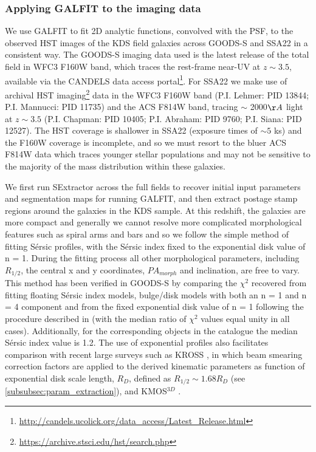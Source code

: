 \documentclass[fleqn,usenatbib]{mn2e}
\newcommand{\Sers}{S\'{e}rsic }
\begin{document}
\subsubsection{Applying GALFIT to the imaging data}\label{subsubsec:galfitting}
We use GALFIT \citep{Peng2010_galfit} to fit 2D analytic functions, convolved with the PSF, to the observed HST images of the KDS field galaxies across GOODS-S and SSA22 in a consistent way.
The GOODS-S imaging data used is the latest release of the total field in WFC3 F160W band, which traces the rest-frame near-UV at $z \sim 3.5$, available via the CANDELS \citep{Grogin2011,Koekemoer2011} data access portal\footnote{\tiny{\url{http://candels.ucolick.org/data_access/Latest_Release.html}}}.
For SSA22 we make use of archival HST imaging\footnote{\tiny{\url{https://archive.stsci.edu/hst/search.php}}} data in the WFC3 F160W band (P.I. Lehmer: PID 13844; P.I. Mannucci: PID 11735) and the ACS F814W band, tracing $\sim$ 2000$\AA$ light at $z\sim 3.5$ (P.I. Chapman: PID 10405; P.I. Abraham: PID 9760; P.I. Siana: PID 12527).
The HST coverage is shallower in SSA22 (exposure times of $\sim 5$ ks) and the F160W coverage is incomplete, and so we must resort to the bluer ACS F814W data which traces younger stellar populations and may not be sensitive to the majority of the mass distribution within these galaxies.

We first run SExtractor \citep{Bertin1996} across the full fields to recover initial input parameters and segmentation maps for running GALFIT, and then extract postage stamp regions around the galaxies in the KDS sample.
At this redshift, the galaxies are more compact and generally we cannot resolve more complicated morphological features such as spiral arms and bars and so we follow the simple method of fitting \Sers profiles, with the \Sers index fixed to the exponential disk value of n = 1.
During the fitting process all other morphological parameters, including $R_{1/2}$, the central x and y coordinates, $PA_{morph}$ and inclination, are free to vary.
This method has been verified in GOODS-S by comparing the $\chi ^{2}$ recovered from fitting floating \Sers index models, bulge/disk models with both an n = 1 and n = 4 component and from the fixed exponential disk value of n = 1 following the procedure described in \cite{Bruce2012} (with the median ratio of $\chi ^{2}$ values equal unity in all cases). Additionally, for the corresponding objects in the \cite{VanderWel2012} catalogue the median \Sers index value is 1.2.
The use of exponential profiles also facilitates comparison with recent large surveys such as KROSS \citep{Harrison2017}, in which beam smearing correction factors are applied to the derived kinematic parameters as function of exponential disk scale length, $R_{D}$, defined as $R_{1/2} \sim 1.68 R_{D}$ (see \cref{subsubsec:param_extraction}), and KMOS$^{3D}$ \citep{Wisnioski2015}.
\end{document}
